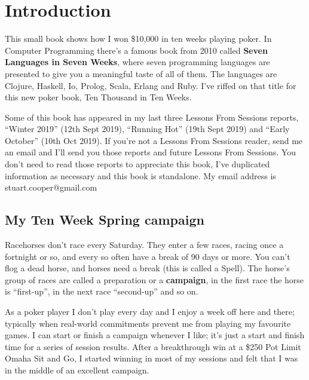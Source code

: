 \chapter{Introduction}


This small book shows how I won \$10,000 in ten weeks playing
poker. In Computer Programming there's a famous book from
2010 called \textbf{Seven Languages in Seven Weeks}, where seven
programming languages are presented to give you a meaningful taste of
all of them. The languages are Clojure, Haskell, Io, Prolog, Scala,
Erlang and Ruby. I've riffed on that title for this new
poker book, Ten Thousand in Ten Weeks.

Some of this book has appeared in my last three Lessons From Sessions
reports, ``Winter 2019'' (12th Sept 2019), ``Running Hot'' (19th Sept
2019) and ``Early October'' (10th Oct 2019). If you're not a Lessons
From Sessions reader, send me an email and I'll send you those reports
and future Lessons From Sessions. You don't need to read those reports
to appreciate this book, I've duplicated information as necessary and
this book is standalone. My email address is stuart.cooper@gmail.com

\section*{My Ten Week Spring campaign}

Racehorses don't race every Saturday. They enter a few races, racing
once a fortnight or so, and every so often have a break of 90 days or
more. You can't flog a dead horse, and horses need a break (this is
called a Spell). The horse's group of races are called a preparation
or a \textbf{campaign}, in the first race the horse is ``first-up'',
in the next race ``second-up'' and so on.

As a poker player I don't play every day and I enjoy a week off here
and there; typically when real-world commitments prevent me from
playing my favourite games. I can start or finish a campaign whenever
I like; it's just a start and finish time for a series of session
results. After a breakthrough win at a \$250 Pot Limit Omaha Sit and
Go, I started winning in most of my sessions and felt that I was in
the middle of an excellent campaign.

